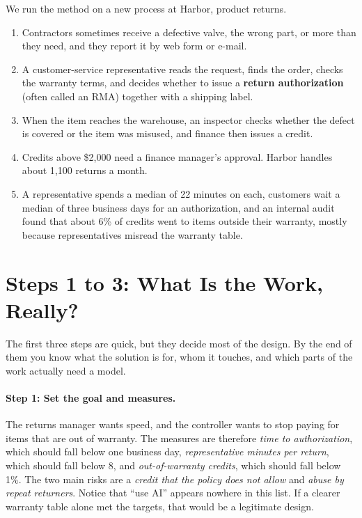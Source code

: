 \begin{runningexample}
We run the method on a new process at Harbor, product returns.
\begin{enumerate}[leftmargin=*,itemsep=2pt]
\item Contractors sometimes receive a defective valve, the wrong part, or more than they need, and they report it by web form or e-mail.
\item A customer-service representative reads the request, finds the order, checks the warranty terms, and decides whether to issue a \textbf{return authorization} (often called an RMA) together with a shipping label.
\item When the item reaches the warehouse, an inspector checks whether the defect is covered or the item was misused, and finance then issues a credit.
\item Credits above \$2{,}000 need a finance manager's approval. Harbor handles about 1{,}100 returns a month.
\item A representative spends a median of 22 minutes on each, customers wait a median of three business days for an authorization, and an internal audit found that about 6\% of credits went to items outside their warranty, mostly because representatives misread the warranty table.
\end{enumerate}
\end{runningexample}

\section{Steps 1 to 3: What Is the Work, Really?}
\label{sec:understand}

The first three steps are quick, but they decide most of the design. By the end of them you know what the solution is for, whom it touches, and which parts of the work actually need a model.

\paragraph{Step 1: Set the goal and measures.} The returns manager wants speed, and the controller wants to stop paying for items that are out of warranty. The measures are therefore \emph{time to authorization}, which should fall below one business day, \emph{representative minutes per return}, which should fall below 8, and \emph{out-of-warranty credits}, which should fall below 1\%. The two main risks are a \emph{credit that the policy does not allow} and \emph{abuse by repeat returners}. Notice that ``use AI'' appears nowhere in this list. If a clearer warranty table alone met the targets, that would be a legitimate design.

